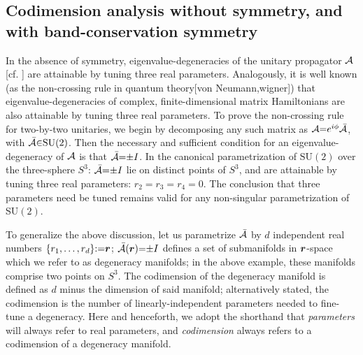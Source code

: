 \documentclass[aps, prb, showpacs, twocolumn, notitlepage, superscriptaddress]{revtex4-1}
\begin{document}
\subsection{Codimension analysis without symmetry, and with band-conservation symmetry}\label{sec:introducecodimension}


In the absence of symmetry,  eigenvalue-degeneracies of the unitary propagator ${\cal A}$ [cf. ] are attainable by tuning three real parameters. Analogously, it is well known (as the non-crossing rule in quantum theory[von Neumann,wigner]) that eigenvalue-degeneracies of complex, finite-dimensional matrix Hamiltonians are also attainable by tuning three real parameters.
 To prove the non-crossing rule for two-by-two unitaries, we begin by decomposing any such matrix as ${\cal A}{=}e^{i\phi}{\cal \bar{A}}$, with  ${\cal \bar{A}}{\in}\text{SU}(2)$. Then the necessary and sufficient condition for an eigenvalue-degeneracy of ${\cal A}$ is that ${\cal \bar{A}}{=}{\pm}I$. In the canonical parametrization of $\text{SU}(2)$ over the three-sphere $S^3$: 
${\cal \bar{A}}{=}{\pm}I$ lie on distinct points of $S^3$, and are attainable by tuning three real parameters: $r_2{=}r_3{=}r_4{=}0$. The conclusion that three parameters need be tuned remains valid for any  non-singular parametrization of SU$(2)$.


 
 
 To generalize the above discussion, let us parametrize ${\cal \bar{A}}$ by $d$ independent real numbers  $\{r_1,\ldots,r_{d}\}{:}{=}\boldsymbol{r} $;  ${\cal \bar{A}}(\boldsymbol{r}){=}{\pm}I$ defines a set of submanifolds in $\boldsymbol{r}$-space which we refer to as degeneracy manifolds; in the above example, these manifolds comprise two points on $S^3$. The codimension of the degeneracy manifold  is defined as $d$ minus the dimension of said manifold; alternatively stated, the codimension is the number of linearly-independent parameters needed to fine-tune a degeneracy. Here and henceforth, we adopt the shorthand that  \textit{parameters} will always refer to real parameters, and \textit{codimension} always refers to a codimension of a degeneracy manifold. 
\end{document}
